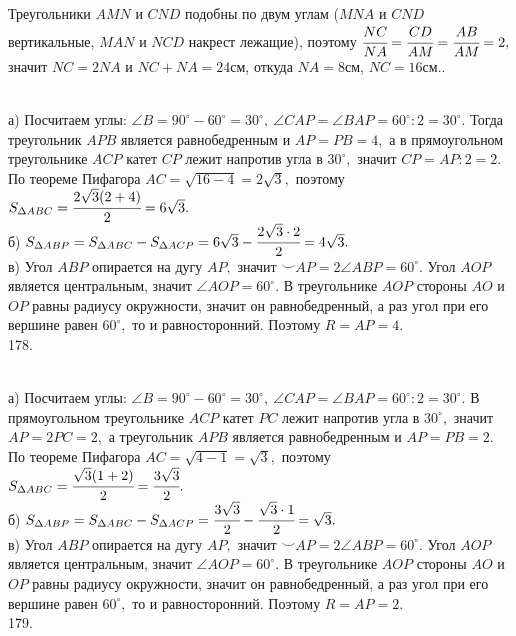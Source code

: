 Треугольники $AMN$ и $CND$ подобны по двум углам ($MNA$ и $CND$ вертикальные, $MAN$ и $NCD$ накрест лежащие), поэтому $\cfrac{NC}{NA}=\cfrac{CD}{AM}=\cfrac{AB}{AM}=2,$ значит $NC=2NA$ и $NC+NA=24$см, откуда $NA=8$см, $NC=16$см.\newpage{}. \begin{figure}[ht!]
\end{figure}\\
а) Посчитаем углы: $\angle B=90^\circ-60^\circ=30^\circ,\ \angle CAP=\angle BAP=60^\circ:2=30^\circ.$ Тогда треугольник $APB$ является равнобедренным и $AP=PB=4,$ а в прямоугольном треугольнике $ACP$ катет $CP$ лежит напротив угла в $30^\circ,$ значит $CP=AP:2=2.$ По теореме Пифагора $AC=\sqrt{16-4}=2\sqrt{3},$ поэтому $S_{\Delta ABC}=\cfrac{2\sqrt{3}(2+4)}{2}=6\sqrt{3}.$\\
б) $S_{\Delta ABP}=S_{\Delta ABC}-S_{\Delta ACP}=6\sqrt{3}-\cfrac{2\sqrt{3}\cdot2}{2}=4\sqrt{3}.$\\
в) Угол $ABP$ опирается на дугу $AP,$ значит $\smile AP=2\angle ABP=60^\circ.$ Угол $AOP$ является центральным, значит $\angle AOP=60^\circ.$ В треугольнике $AOP$ стороны $AO$ и $OP$ равны радиусу окружности, значит он равнобедренный, а раз угол при его вершине равен $60^\circ,$ то и равносторонний. Поэтому $R=AP=4.$\\
178. \begin{figure}[ht!]
\end{figure}\\
а) Посчитаем углы: $\angle B=90^\circ-60^\circ=30^\circ,\ \angle CAP=\angle BAP=60^\circ:2=30^\circ.$ В прямоугольном треугольнике $ACP$ катет $PC$ лежит напротив угла в $30^\circ,$ значит $AP=2PC=2,$ а треугольник $APB$ является равнобедренным и $AP=PB=2.$ По теореме Пифагора $AC=\sqrt{4-1}=\sqrt{3},$ поэтому $S_{\Delta ABC}=\cfrac{\sqrt{3}(1+2)}{2}=\cfrac{3\sqrt{3}}{2}.$\\
б) $S_{\Delta ABP}=S_{\Delta ABC}-S_{\Delta ACP}=\cfrac{3\sqrt{3}}{2}-\cfrac{\sqrt{3}\cdot1}{2}=\sqrt{3}.$\\
в) Угол $ABP$ опирается на дугу $AP,$ значит $\smile AP=2\angle ABP=60^\circ.$ Угол $AOP$ является центральным, значит $\angle AOP=60^\circ.$ В треугольнике $AOP$ стороны $AO$ и $OP$ равны радиусу окружности, значит он равнобедренный, а раз угол при его вершине равен $60^\circ,$ то и равносторонний. Поэтому $R=AP=2.$\\
179. \begin{figure}[ht!]
\end{figure}\\
